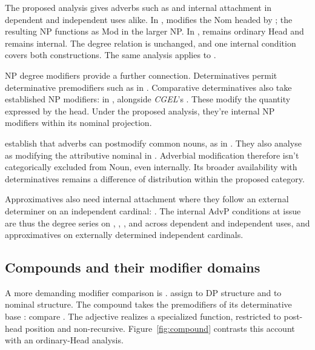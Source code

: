\documentclass[12pt]{article}
\begin{document}
The proposed analysis gives adverbs such as  and  internal attachment in dependent and independent uses alike. In ,  modifies the Nom headed by ; the resulting  NP functions as Mod in the larger NP. In ,  remains ordinary Head and  remains internal. The degree relation is unchanged, and one internal condition covers both constructions. The same analysis applies to .

NP degree modifiers provide a further connection. Determinatives permit determinative premodifiers such as  in  \citep[393]{huddleston2002}. Comparative determinatives also take established NP modifiers:  in , alongside \textit{CGEL}'s  \citep[432]{huddleston2002}. These modify the quantity expressed by the head. Under the proposed analysis, they're internal NP modifiers within its nominal projection.

\textcite[42--47]{payne2010} establish that adverbs can postmodify common nouns, as in . They also analyse  as modifying the attributive nominal  in  \citep[p.~75, n.~3]{payne2010}. Adverbial modification therefore isn't categorically excluded from Noun, even internally. Its broader availability with determinatives remains a difference of distribution within the proposed category.

Approximatives also need internal attachment where they follow an external determiner on an independent cardinal: . The internal AdvP conditions at issue are thus the degree series on , , , and  across dependent and independent uses, and approximatives on externally determined independent cardinals.

\subsection{Compounds and their modifier domains}\label{sec:compounds}

A more demanding modifier comparison is . \textcite[581--583]{Payne2007} assign  to DP structure and  to nominal structure. The compound  takes the premodifiers of its determinative base : compare . The adjective realizes a specialized  function, restricted to post-head position and non-recursive. Figure~\ref{fig:compound} contrasts this account with an ordinary-Head analysis.
\end{document}
